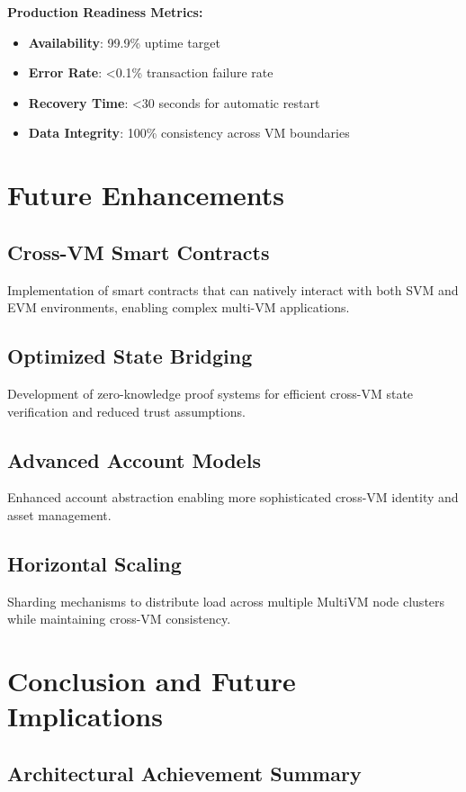 \documentclass[11pt,a4paper]{article}
\begin{document}
\textbf{Production Readiness Metrics:}

\begin{itemize}
    \item \textbf{Availability}: 99.9\% uptime target
    \item \textbf{Error Rate}: <0.1\% transaction failure rate
    \item \textbf{Recovery Time}: <30 seconds for automatic restart
    \item \textbf{Data Integrity}: 100\% consistency across VM boundaries
\end{itemize}

\section{Future Enhancements}

\subsection{Cross-VM Smart Contracts}
Implementation of smart contracts that can natively interact with both SVM and EVM environments, enabling complex multi-VM applications.

\subsection{Optimized State Bridging}
Development of zero-knowledge proof systems for efficient cross-VM state verification and reduced trust assumptions.

\subsection{Advanced Account Models}
Enhanced account abstraction enabling more sophisticated cross-VM identity and asset management.

\subsection{Horizontal Scaling}
Sharding mechanisms to distribute load across multiple MultiVM node clusters while maintaining cross-VM consistency.

\section{Conclusion and Future Implications}

\subsection{Architectural Achievement Summary}
\end{document}
